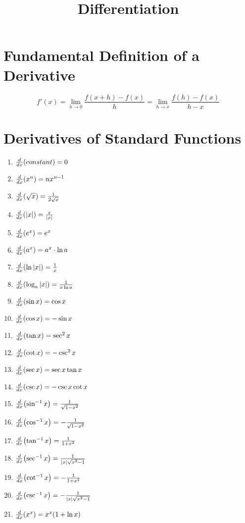 \documentclass{article}
\title{Differentiation}
\author{}
\date{}
\begin{document}
\maketitle

\section{Fundamental Definition of a Derivative}

$$
f'(x)=\lim\limits_{h \to 0}{\frac{f(x+h)-f(x)}{h}}=\lim\limits_{h \to x}{\frac{f(h)-f(x)}{h-x}}
$$

\section{Derivatives of Standard Functions}

\begin{enumerate}[i]
    \item $\dv{x}(constant)=0$
    \item $\dv{x}(x^n)=nx^{n-1}$
    \item $\dv{x}(\sqrt{x})=\frac{1}{2\sqrt{x}}$
    \item $\dv{x}(|x|)=\frac{x}{|x|}$
    \item $\dv{x}(e^x)=e^x$
    \item $\dv{x}(a^x)=a^x \cdot \ln a$
    \item $\dv{x}(\ln |x|)=\frac{1}{x}$
    \item $\dv{x}(\log_{a}{|x|})=\frac{1}{x\ln a}$
    \item $\dv{x}(\sin x)=\cos x$
    \item $\dv{x}(\cos x)=-\sin x$
    \item $\dv{x}(\tan x)=\sec^2 x$
    \item $\dv{x}(\cot x)=-\csc^2 x$
    \item $\dv{x}(\sec x)=\sec x \tan x$
    \item $\dv{x}(\csc x)=-\csc x \cot x$
    \item $\dv{x}(\sin^{-1}x)=\frac{1}{\sqrt{1-x^2}}$
    \item $\dv{x}(\cos^{-1}x)=-\frac{1}{\sqrt{1-x^2}}$
    \item $\dv{x}(\tan^{-1}x)=\frac{1}{1+x^2}$
    \item $\dv{x}(\sec^{-1}x)=\frac{1}{|x|\sqrt{x^2-1}}$
    \item $\dv{x}(\cot^{-1}x)=-\frac{1}{1+x^2}$
    \item $\dv{x}(\csc^{-1}x)=-\frac{1}{|x|\sqrt{x^2-1}}$
    \item $\dv{x}(x^x)=x^x(1+\ln x)$
\end{enumerate}
\end{document}
